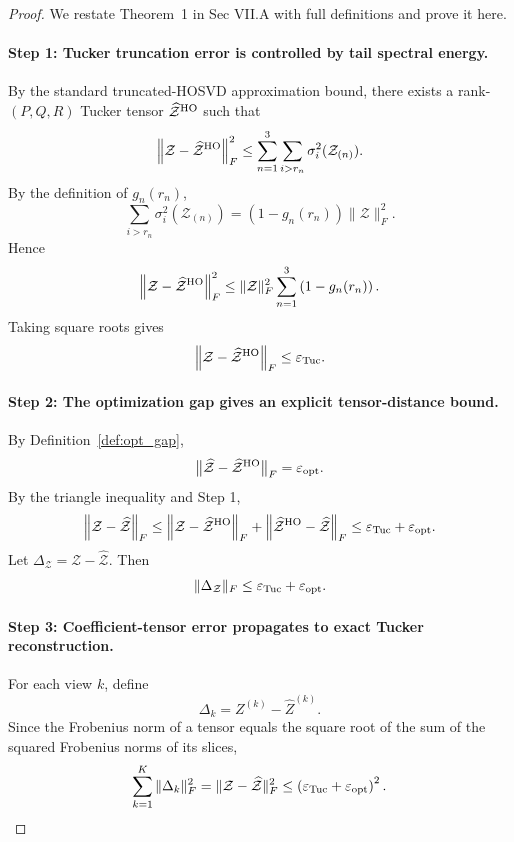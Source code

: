 \documentclass[11pt]{article}
\begin{document}
\begin{proof}
	We restate Theorem~1 in Sec VII.A with full definitions and prove it here.
	
	\paragraph{Step 1: Tucker truncation error is controlled by tail spectral energy.}
	By the standard truncated-HOSVD approximation bound, there exists a rank-$(P,Q,R)$ Tucker tensor $\widehat{\mathcal Z}^{\rm HO}$ such that
	\[
	\left\|
	\mathcal Z-\widehat{\mathcal Z}^{\rm HO}
	\right\|_F^2
	\le
	\sum_{n=1}^{3}
	\sum_{i>r_n}
	\sigma_i^2(\mathcal Z_{(n)}).
	\]
	By the definition of $g_n(r_n)$,
	\[
	\sum_{i>r_n}
	\sigma_i^2(\mathcal Z_{(n)})
	=
	\left(1-g_n(r_n)\right)
	\|\mathcal Z\|_F^2 .
	\]
	Hence
	\[
	\left\|
	\mathcal Z-\widehat{\mathcal Z}^{\rm HO}
	\right\|_F^2
	\le
	\|\mathcal Z\|_F^2
	\sum_{n=1}^{3}
	\left(1-g_n(r_n)\right).
	\]
	Taking square roots gives
	\[
	\left\|
	\mathcal Z-\widehat{\mathcal Z}^{\rm HO}
	\right\|_F
	\le
	\varepsilon_{\rm Tuc}.
	\]
	
	\paragraph{Step 2: The optimization gap gives an explicit tensor-distance bound.}
	By Definition~\ref{def:opt_gap},
	\[
	\bigl\|\widehat{\mathcal Z}-\widehat{\mathcal Z}^{\rm HO}\bigr\|_F
	=\varepsilon_{\rm opt}.
	\]
	By the triangle inequality and Step 1,
	\[
	\left\|
	\mathcal Z-\widehat{\mathcal Z}
	\right\|_F
	\le
	\left\|
	\mathcal Z-\widehat{\mathcal Z}^{\rm HO}
	\right\|_F
	+
	\left\|
	\widehat{\mathcal Z}^{\rm HO}-\widehat{\mathcal Z}
	\right\|_F
	\le
	\varepsilon_{\rm Tuc}
	+
	\varepsilon_{\rm opt}.
	\]
	Let \(\Delta_{\mathcal Z}=\mathcal Z-\widehat{\mathcal Z}\). Then
	\[
	\|\Delta_{\mathcal Z}\|_F
	\le
	\varepsilon_{\rm Tuc}
	+
	\varepsilon_{\rm opt}.
	\]
	
	\paragraph{Step 3: Coefficient-tensor error propagates to exact Tucker reconstruction.}
	For each view $k$, define
	\[
	\Delta_k
	=
	Z^{(k)}-\widehat Z^{(k)} .
	\]
	Since the Frobenius norm of a tensor equals the square root of the sum of the squared Frobenius norms of its slices,
	\[
	\sum_{k=1}^{K}
	\|\Delta_k\|_F^2
	=
	\|\mathcal Z-\widehat{\mathcal Z}\|_F^2
	\le
	\left(
	\varepsilon_{\rm Tuc}
	+
	\varepsilon_{\rm opt}
	\right)^2 .
	\]
	

\end{proof}
\end{document}
